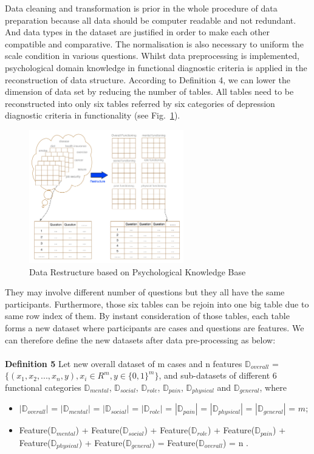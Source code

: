 \documentclass[12pt]{article}
\begin{document}
Data cleaning and transformation is prior in the whole procedure of data preparation because all data should be computer readable and not redundant. And data types in the dataset are justified in order to make each other compatible and comparative. The normalisation is also necessary to uniform the scale condition in various questions. Whilst data preprocessing is implemented, psychological domain knowledge in functional diagnostic criteria is applied in the reconstruction of data structure. According to Definition 4, we can lower the dimension of data set by reducing the number of tables. All tables need to be reconstructed into only six tables referred by six categories of depression diagnostic criteria in functionality (see Fig.~\ref{fig3}).
\begin{figure}[h]
\hspace{2cm}
\includegraphics[width=0.6\textwidth]{restructure.png}
\caption{Data Restructure based on Psychological Knowledge Base} \label{fig3}
\end{figure}
They may involve different number of questions but they all have the same participants. Furthermore, those six tables can be rejoin into one big table due to same row index of them. By instant consideration of those tables, each table forms a new dataset where participants are cases and questions are features. We can therefore define the new datasets after data pre-processing as below:\\
\\
\textbf{Definition 5} Let new overall dataset of m cases and n features $\mathbb{D}_{overall}$ = $\displaystyle \big\{ (x_{1}, x_{2}, ... , x_{n}, y ), x_{i} \in R^{m}, y \in {\{0, 1\}}^{m}  \big\}$, and sub-datasets of different 6 functional categories $\mathbb{D}_{mental}$, $\mathbb{D}_{social}$, $\mathbb{D}_{role}$, $\mathbb{D}_{pain}$, $\mathbb{D}_{physical}$ and $\mathbb{D}_{general}$, where
\begin{itemize}
  \item $|\mathbb{D}_{overall}|$ = $|\mathbb{D}_{mental}|$ = $|\mathbb{D}_{social}|$ = $|\mathbb{D}_{role}|$ = $|\mathbb{D}_{pain}|$ = $|\mathbb{D}_{physical}|$ = $|\mathbb{D}_{general}|$ = $m$;
  \item Feature($\mathbb{D}_{mental}$) + Feature($\mathbb{D}_{social}$) + Feature($\mathbb{D}_{role}$) + Feature($\mathbb{D}_{pain}$) + Feature($\mathbb{D}_{physical}$) + Feature($\mathbb{D}_{general}$) = Feature($\mathbb{D}_{overall}$) = n . \\
\end{itemize}
\end{document}
